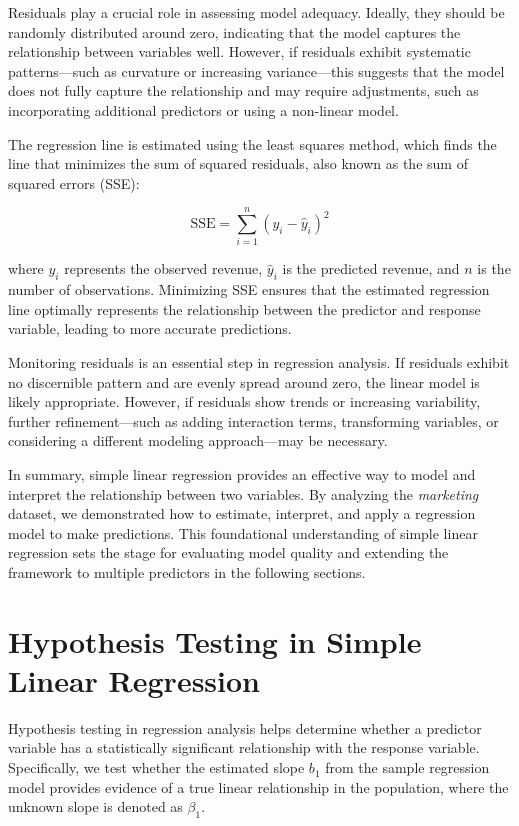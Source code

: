 \documentclass[
  11pt,
]{book}
\theoremstyle{definition}
\theoremstyle{definition}
\theoremstyle{definition}
\theoremstyle{definition}
\theoremstyle{remark}
\begin{document}
Residuals play a crucial role in assessing model adequacy. Ideally, they should be randomly distributed around zero, indicating that the model captures the relationship between variables well. However, if residuals exhibit systematic patterns---such as curvature or increasing variance---this suggests that the model does not fully capture the relationship and may require adjustments, such as incorporating additional predictors or using a non-linear model.

The regression line is estimated using the least squares method, which finds the line that minimizes the sum of squared residuals, also known as the sum of squared errors (SSE):

\begin{equation} 
\text{SSE} = \sum_{i=1}^{n} (y_i - \hat{y}_i)^2
\label{eq:sse}
\end{equation}

where \(y_i\) represents the observed revenue, \(\hat{y}_i\) is the predicted revenue, and \(n\) is the number of observations. Minimizing SSE ensures that the estimated regression line optimally represents the relationship between the predictor and response variable, leading to more accurate predictions.

Monitoring residuals is an essential step in regression analysis. If residuals exhibit no discernible pattern and are evenly spread around zero, the linear model is likely appropriate. However, if residuals show trends or increasing variability, further refinement---such as adding interaction terms, transforming variables, or considering a different modeling approach---may be necessary.

In summary, simple linear regression provides an effective way to model and interpret the relationship between two variables. By analyzing the \emph{marketing} dataset, we demonstrated how to estimate, interpret, and apply a regression model to make predictions. This foundational understanding of simple linear regression sets the stage for evaluating model quality and extending the framework to multiple predictors in the following sections.

\section*{Hypothesis Testing in Simple Linear Regression}\label{hypothesis-testing-in-simple-linear-regression}


Hypothesis testing in regression analysis helps determine whether a predictor variable has a statistically significant relationship with the response variable. Specifically, we test whether the estimated slope \(b_1\) from the sample regression model provides evidence of a true linear relationship in the population, where the unknown slope is denoted as \(\beta_1\).
\end{document}
